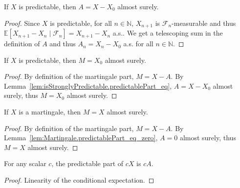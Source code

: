 \begin{lemma}\label{lem:isStronglyPredictable.predictablePart_eq}
  \mathlibok
If $X$ is predictable, then $A = X - X_0$ almost surely.
\end{lemma}

\begin{proof}  
Since $X$ is predictable, for all $n \in \mathbb{N}$, $X_{n+1}$ is $\mathcal{F}_n$-measurable and thus $\mathbb{E}[X_{n+1} - X_n \mid \mathcal{F}_n] = X_{n+1} - X_n$ a.s..
We get a telescoping sum in the definition of $A$ and thus $A_n = X_n - X_0$ a.s. for all $n \in \mathbb{N}$.
\end{proof}


\begin{lemma}\label{lem:martingalePart_eq_zero}
  \mathlibok
If $X$ is predictable, then $M = X_0$ almost surely.
\end{lemma}

\begin{proof}  
By definition of the martingale part, $M = X - A$. By Lemma~\ref{lem:isStronglyPredictable.predictablePart_eq}, $A = X - X_0$ almost surely, thus $M = X_0$ almost surely.
\end{proof}


\begin{lemma}\label{lem:Martingale.martingalePart_eq}
  \mathlibok
If $X$ is a martingale, then $M = X$ almost surely.
\end{lemma}

\begin{proof}  
By definition of the martingale part, $M = X - A$. By Lemma~\ref{lem:Martingale.predictablePart_eq_zero}, $A = 0$ almost surely, thus $M = X$ almost surely.
\end{proof}


\begin{lemma}\label{lem:predictablePart_smul}
  \mathlibok
For any scalar $c$, the predictable part of $c X$ is $c A$.
\end{lemma}

\begin{proof}  
Linearity of the conditional expectation.
\end{proof}


